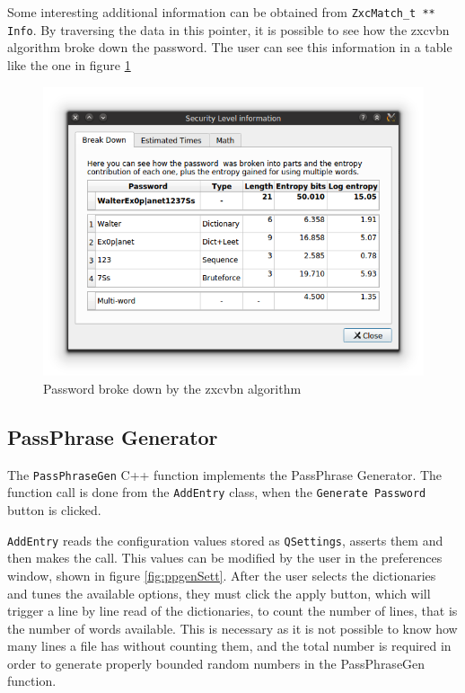 Some interesting additional information can be obtained from \texttt{ZxcMatch\_t ** Info}. By traversing the data in this pointer, it is possible to see how the zxcvbn algorithm broke down the password. The user can see this information in a table like the one in figure \ref{fig:zxcvbnBreak}
\begin{figure}[htb]    
  \centering
  \captionsetup{justification=centering}
  \includegraphics[width=0.9\columnwidth]{chapters/figures/development/zxcvbnBreak}
  \caption{Password broke down by the zxcvbn algorithm}
  \label{fig:zxcvbnBreak}
\end{figure}



\subsection{PassPhrase Generator}

The \texttt{PassPhraseGen} C++ function implements the PassPhrase Generator. The function call is done from the \texttt{AddEntry} class, when the \texttt{Generate Password} button is clicked.

\texttt{AddEntry} reads the configuration values stored as \texttt{QSettings}, asserts them and then makes the call. This values can be modified by the user in the preferences window, shown in figure \ref{fig:ppgenSett}. After the user selects the dictionaries and tunes the available options, they must click the apply button, which will trigger a line by line read of the dictionaries, to count the number of lines, that is the number of words available. This is necessary as it is not possible to know how many lines a file has without counting them, and the total number is required in order to generate properly bounded random numbers in the PassPhraseGen function.

